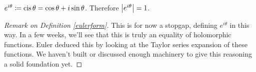 \begin{definition}\label{eulerform}
$e^{i\theta} \coloneqq \operatorname{cis}\theta = \cos\theta + i\sin\theta$. Therefore $\left\lvert e^{i\theta}\right\rvert = 1$.
\end{definition}
\begin{proof}[Remark on Definition \ref{eulerform}]\renewcommand{\qedsymbol}{}
This is for now a stopgap, defining $e^{i\theta}$ in this way. In a few weeks, we'll see that this is truly an equality of holomorphic functions. Euler deduced this by looking at the Taylor series expansion of these functions. We haven't built or discussed enough machinery to give this reasoning a solid foundation yet. 
\end{proof}


